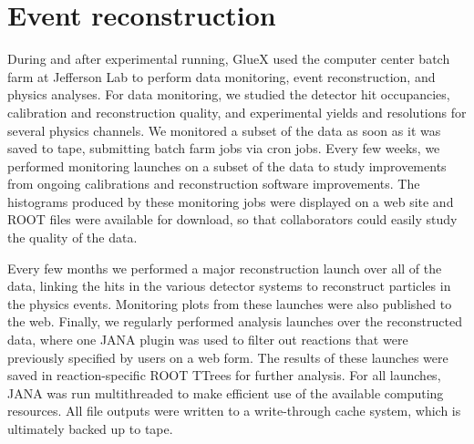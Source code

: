 

\section[Event reconstruction]{Event reconstruction \label{sec:reconstruction}}


During and after experimental running, GlueX used the computer center batch farm at Jefferson Lab to perform data monitoring, event reconstruction, and physics analyses.  For data monitoring, we studied the detector hit occupancies, calibration and reconstruction quality, and experimental yields and resolutions for several physics channels.  We monitored a subset of the data as soon as it was saved to tape, submitting batch farm jobs via cron jobs.  Every few weeks, we performed monitoring launches on a subset of the data to study improvements from ongoing calibrations and reconstruction software improvements.  The histograms produced by these monitoring jobs were displayed on a web site and ROOT files were available for download, so that collaborators could easily study the quality of the data. 

Every few months we performed a major reconstruction launch over all of the data, linking the hits in the various detector systems to reconstruct particles in the physics events.  Monitoring plots from these launches were also published to the web. Finally, we regularly performed analysis launches over the reconstructed data, where one JANA plugin was used to filter out reactions that were previously specified by users on a web form. The results of these launches were saved in reaction-specific ROOT TTrees for further analysis. For all launches, JANA was run multithreaded to make efficient use of the available computing resources.  %
All file outputs were written to a write-through cache system, which is ultimately backed up to tape.  

